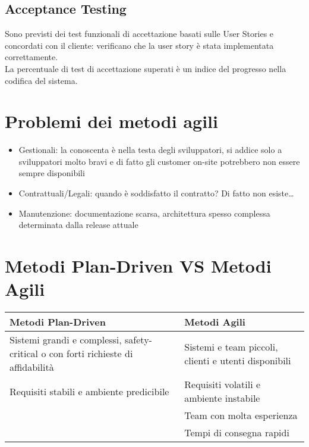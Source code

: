 \documentclass[12pt, a4paper]{report}
\begin{document}
\subsection{Acceptance Testing}
Sono previsti dei test funzionali di accettazione basati sulle User Stories e concordati con il cliente: verificano che la user story è stata implementata correttamente.\\
La percentuale di test di accettazione superati è un indice del progresso nella codifica del sistema.
\section{Problemi dei metodi agili}
\begin{itemize}
    \item Gestionali: la conoscenta è nella testa degli sviluppatori, si addice solo a sviluppatori molto bravi e di fatto gli customer on-site potrebbero non essere sempre disponibili 
    \item Contrattuali/Legali: quando è soddisfatto il contratto? Di fatto non esiste\dots
    \item Manutenzione: documentazione scarsa, architettura spesso complessa determinata dalla release attuale
\end{itemize}
\section{Metodi Plan-Driven VS Metodi Agili}
\begin{center}
    \begin{tabular}{| p{8cm} | p{7cm} |}
        \hline
        \textbf{Metodi Plan-Driven} & \textbf{Metodi Agili} \\
        \hline
        Sistemi grandi e complessi, safety-critical o con forti richieste di affidabilità & Sistemi e team piccoli, clienti e utenti disponibili \\
        \hline
        Requisiti stabili e ambiente predicibile & Requisiti volatili e ambiente instabile \\
        \hline
        & Team con molta esperienza \\
        \hline
        & Tempi di consegna rapidi \\
        \hline
    \end{tabular}
\end{center}
\end{document}
